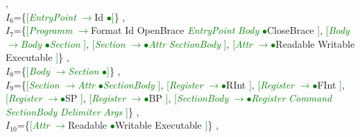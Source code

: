 \documentclass[a0]{a0poster}
\begin{document}
,\\
$I_{6}$=\{\textcolor{Green}{[}\textcolor{Green}{\textit{EntryPoint}} \textcolor{Green}{$\to$}Id \textcolor{Green}{$\bullet$}\textcolor{Green}{]}\}
,\\
$I_{7}$=\{\textcolor{Green}{[}\textcolor{Green}{\textit{Programm}} \textcolor{Green}{$\to$}Format Id OpenBrace \textcolor{Green}{\textit{EntryPoint}} \textcolor{Green}{\textit{Body}} \textcolor{Green}{$\bullet$}CloseBrace \textcolor{Green}{]}, \textcolor{Green}{[}\textcolor{Green}{\textit{Body}} \textcolor{Green}{$\to$}\textcolor{Green}{\textit{Body}} \textcolor{Green}{$\bullet$}\textcolor{Green}{\textit{Section}} \textcolor{Green}{]}, \textcolor{Green}{[}\textcolor{Green}{\textit{Section}} \textcolor{Green}{$\to$}\textcolor{Green}{$\bullet$}\textcolor{Green}{\textit{Attr}} \textcolor{Green}{\textit{SectionBody}} \textcolor{Green}{]}, \textcolor{Green}{[}\textcolor{Green}{\textit{Attr}} \textcolor{Green}{$\to$}\textcolor{Green}{$\bullet$}Readable Writable Executable \textcolor{Green}{]}\}
,\\
$I_{8}$=\{\textcolor{Green}{[}\textcolor{Green}{\textit{Body}} \textcolor{Green}{$\to$}\textcolor{Green}{\textit{Section}} \textcolor{Green}{$\bullet$}\textcolor{Green}{]}\}
,\\
$I_{9}$=\{\textcolor{Green}{[}\textcolor{Green}{\textit{Section}} \textcolor{Green}{$\to$}\textcolor{Green}{\textit{Attr}} \textcolor{Green}{$\bullet$}\textcolor{Green}{\textit{SectionBody}} \textcolor{Green}{]}, \textcolor{Green}{[}\textcolor{Green}{\textit{Register}} \textcolor{Green}{$\to$}\textcolor{Green}{$\bullet$}RInt \textcolor{Green}{]}, \textcolor{Green}{[}\textcolor{Green}{\textit{Register}} \textcolor{Green}{$\to$}\textcolor{Green}{$\bullet$}FInt \textcolor{Green}{]}, \textcolor{Green}{[}\textcolor{Green}{\textit{Register}} \textcolor{Green}{$\to$}\textcolor{Green}{$\bullet$}SP \textcolor{Green}{]}, \textcolor{Green}{[}\textcolor{Green}{\textit{Register}} \textcolor{Green}{$\to$}\textcolor{Green}{$\bullet$}BP \textcolor{Green}{]}, \textcolor{Green}{[}\textcolor{Green}{\textit{SectionBody}} \textcolor{Green}{$\to$}\textcolor{Green}{$\bullet$}\textcolor{Green}{\textit{Register}} \textcolor{Green}{\textit{Command}} \textcolor{Green}{\textit{SectionBody}} \textcolor{Green}{\textit{Delimiter}} \textcolor{Green}{\textit{Args}} \textcolor{Green}{]}\}
,\\
$I_{10}$=\{\textcolor{Green}{[}\textcolor{Green}{\textit{Attr}} \textcolor{Green}{$\to$}Readable \textcolor{Green}{$\bullet$}Writable Executable \textcolor{Green}{]}\}
,\\
\end{document}
